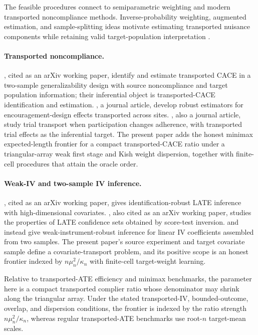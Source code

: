 The feasible procedures connect to semiparametric weighting and modern transported noncompliance methods. Inverse-probability weighting, augmented estimation, and sample-splitting ideas motivate estimating transported nuisance components while retaining valid target-population interpretation \citep{HiranoImbensRidder2003,RobinsRotnitzkyZhao1994,VanDerLaanRubin2006,Chernozhukov2018}.

\paragraph{Transported noncompliance.}
, cited as an arXiv working paper, identify and estimate transported CACE in a two-sample generalizability design with source noncompliance and target population information; their inferential object is transported-CACE identification and estimation. , a journal article, develop robust estimators for encouragement-design effects transported across sites. , also a journal article, study trial transport when participation changes adherence, with transported trial effects as the inferential target. The present paper adds the honest minimax expected-length frontier for a compact transported-CACE ratio under a triangular-array weak first stage and Kish weight dispersion, together with finite-cell procedures that attain the oracle order.

\paragraph{Weak-IV and two-sample IV inference.}
, cited as an arXiv working paper, gives identification-robust LATE inference with high-dimensional covariates. , also cited as an arXiv working paper, studies the properties of LATE confidence sets obtained by score-test inversion.  and \citet{ChoiShen2019} instead give weak-instrument-robust inference for linear IV coefficients assembled from two samples. The present paper's source experiment and target covariate sample define a covariate-transport problem, and its positive scope is an honest frontier indexed by \(n\mu_n^2/\kappa_n\) with finite-cell target-weight learning.

Relative to transported-ATE efficiency and minimax benchmarks, the parameter here is a compact transported complier ratio whose denominator may shrink along the triangular array. Under the stated transported-IV, bounded-outcome, overlap, and dispersion conditions, the frontier is indexed by the ratio strength \(n\mu_n^2/\kappa_n\), whereas regular transported-ATE benchmarks use root-\(n\) target-mean scales.

